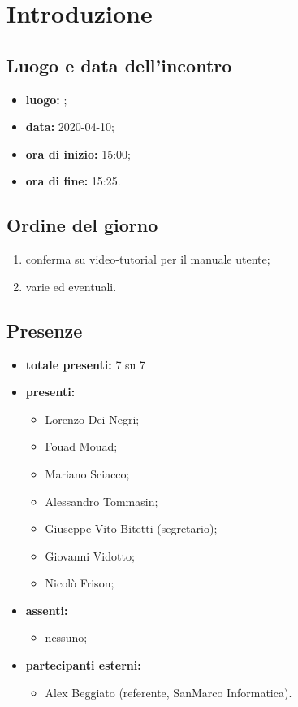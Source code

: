 \section*{Introduzione}

\subsection*{Luogo e data dell'incontro}
	\begin{itemize}
		\item \textbf{luogo:} ;
		\item \textbf{data:} 2020-04-10;
		\item \textbf{ora di inizio:} 15:00;
		\item \textbf{ora di fine:} 15:25.
	\end{itemize}

\subsection*{Ordine del giorno}
	\begin{enumerate}
			\item conferma su video-tutorial per il manuale utente;
  		\item varie ed eventuali.
	\end{enumerate}

\subsection*{Presenze}
	\begin{itemize}
		\item \textbf{totale presenti:} 7 su 7
		\item \textbf{presenti: }
			\begin{itemize}
				\item Lorenzo Dei Negri;
				\item Fouad Mouad;
				\item Mariano Sciacco;
				\item Alessandro Tommasin;
				\item Giuseppe Vito Bitetti (segretario);
				\item Giovanni Vidotto;
				\item Nicolò Frison;
			\end{itemize}
		\item \textbf{assenti: }
			\begin{itemize}
				\item nessuno;
			\end{itemize}
		\item  \textbf{partecipanti esterni:}
			\begin{itemize}
				\item Alex Beggiato (referente, SanMarco Informatica).
			\end{itemize}
	\end{itemize}


